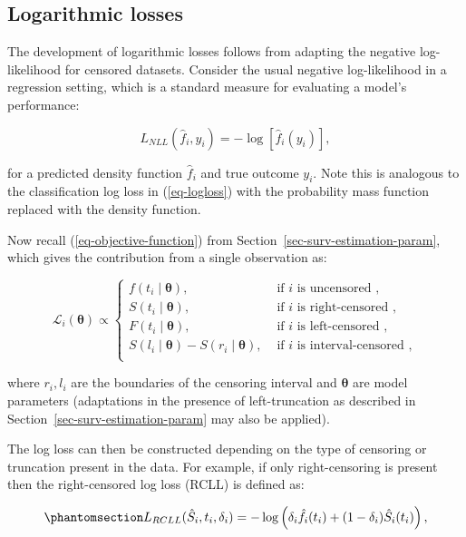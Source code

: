 \documentclass[
  letterpaper,
  krantz2]{style/krantz}
\begin{document}
\subsection{Logarithmic losses}\label{sec-rules-log}

The development of logarithmic losses follows from adapting the negative
log-likelihood for censored datasets. Consider the usual negative
log-likelihood in a regression setting, which is a standard measure for
evaluating a model's performance:

\[
L_{NLL}(\hat{f}_i, y_i) = -\log[\hat{f}_i(y_i)],
\]

for a predicted density function \(\hat{f}_i\) and true outcome \(y_i\).
Note this is analogous to the classification log loss in
(\ref{eq-logloss}) with the probability mass function replaced with the
density function.

Now recall (\ref{eq-objective-function}) from
Section~\ref{sec-surv-estimation-param}, which gives the contribution
from a single observation as:

\[
\mathcal{L}_i(\boldsymbol{\theta}) \propto
\begin{cases}
f(t_i \mid \boldsymbol{\theta}), & \text{ if $i$ is uncensored }, \\
S(t_i \mid \boldsymbol{\theta}), & \text{ if $i$ is right-censored }, \\
F(t_i \mid \boldsymbol{\theta}), & \text{ if $i$ is left-censored }, \\
S(l_i \mid \boldsymbol{\theta}) - S(r_i \mid \boldsymbol{\theta}), & \text{ if $i$ is interval-censored }, \\
\end{cases}
\]

where \(r_i, l_i\) are the boundaries of the censoring interval and
\(\boldsymbol{\theta}\) are model parameters (adaptations in the
presence of left-truncation as described in
Section~\ref{sec-surv-estimation-param} may also be applied).

The log loss can then be constructed depending on the type of censoring
or truncation present in the data. For example, if only right-censoring
is present then the right-censored log loss (RCLL) is defined
as:

\begin{equation}\phantomsection\label{eq-rcll}{
L_{RCLL}(\hat{S}_i, t_i, \delta_i) = -\log\left(\delta_i\hat{f}_i(t_i) + (1-\delta_i)\hat{S}_i(t_i)\right),
}\end{equation}
\end{document}
